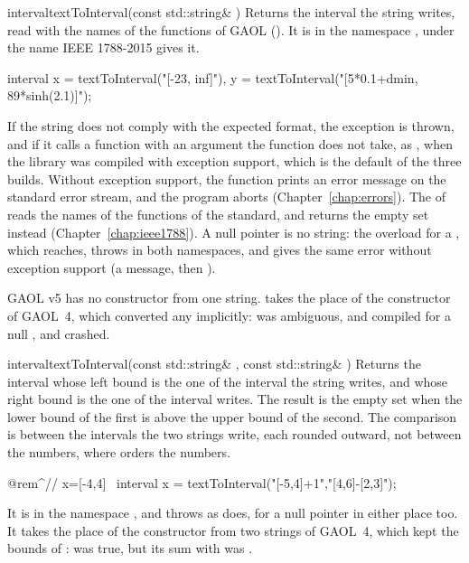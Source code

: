 \begin{deffun}{interval}{textToInterval}{(const std::string\& )}
  Returns the interval the string  writes, read with the names of the
  functions of GAOL (). It is in the namespace
  , under the name IEEE 1788-2015 gives it.
  \begin{example}
interval x = textToInterval("[-23, inf]"),
         y = textToInterval("[5*0.1+dmin, 89*sinh(2.1)]");
  \end{example}
  If the string does not comply with the expected format, the exception
   is thrown, and  if it
  calls a function with an argument the function does not take, as
  , when the library was compiled with exception
  support, which is the default of the three builds. Without exception
  support, the function  prints an error message on the
  standard error stream, and the program aborts (Chapter~\ref{chap:errors}). The  of
   reads the names of the functions of the standard, and
  returns the empty set instead (Chapter~\ref{chap:ieee1788}). A null pointer
  is no string: the overload for a , which
   reaches, throws 
  in both namespaces, and gives the same error without exception support (a
  message, then ).\newinvfive

  GAOL v5 has no constructor from one string.  takes
  the place of the constructor  of GAOL~4, which
  converted any  implicitly:  was
  ambiguous, and  compiled for a null , and
  crashed.\newinvfive
\end{deffun}

\begin{deffun}{interval}{textToInterval}{(const std::string\& , const std::string\& )}
  Returns the interval whose left bound is the one of the interval the string
   writes, and whose right bound is the one of the interval 
  writes. The result is the empty set when the lower bound of the first is
  above the upper bound of the second. The comparison is between the
  intervals the two strings write, each rounded outward, not between the
  numbers, where  orders the numbers.
  \begin{example}
 @rem^// x=[-4,4]~
 interval x = textToInterval("[-5,4]+1","[4,6]-[2,3]");
  \end{example}
  It is in the namespace , and throws 
  as  does, for a null pointer in either place
  too. It takes the place of the constructor from two strings of GAOL~4, which
  kept the bounds  of : 
  was true, but its sum with  was .\newinvfive
\end{deffun}

